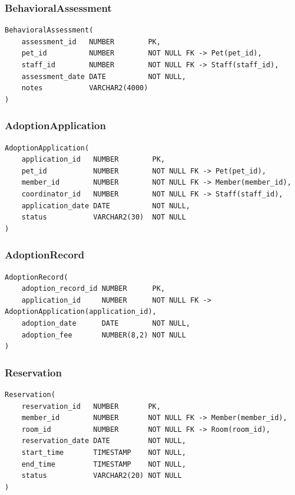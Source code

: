 \documentclass[11pt]{article}
\begin{document}
\subsubsection*{BehavioralAssessment}
\begin{verbatim}
BehavioralAssessment(
    assessment_id   NUMBER        PK,
    pet_id          NUMBER        NOT NULL FK -> Pet(pet_id),
    staff_id        NUMBER        NOT NULL FK -> Staff(staff_id),
    assessment_date DATE          NOT NULL,
    notes           VARCHAR2(4000)
)
\end{verbatim}

\subsubsection*{AdoptionApplication}
\begin{verbatim}
AdoptionApplication(
    application_id   NUMBER        PK,
    pet_id           NUMBER        NOT NULL FK -> Pet(pet_id),
    member_id        NUMBER        NOT NULL FK -> Member(member_id),
    coordinator_id   NUMBER        NOT NULL FK -> Staff(staff_id),
    application_date DATE          NOT NULL,
    status           VARCHAR2(30)  NOT NULL
)
\end{verbatim}

\subsubsection*{AdoptionRecord}
\begin{verbatim}
AdoptionRecord(
    adoption_record_id NUMBER      PK,
    application_id     NUMBER      NOT NULL FK -> AdoptionApplication(application_id),
    adoption_date      DATE        NOT NULL,
    adoption_fee       NUMBER(8,2) NOT NULL
)
\end{verbatim}

\subsubsection*{Reservation}
\begin{verbatim}
Reservation(
    reservation_id   NUMBER       PK,
    member_id        NUMBER       NOT NULL FK -> Member(member_id),
    room_id          NUMBER       NOT NULL FK -> Room(room_id),
    reservation_date DATE         NOT NULL,
    start_time       TIMESTAMP    NOT NULL,
    end_time         TIMESTAMP    NOT NULL,
    status           VARCHAR2(20) NOT NULL
)
\end{verbatim}
\end{document}
